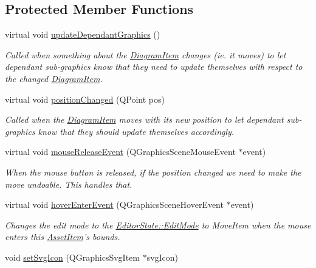 \subsection*{Protected Member Functions}
\begin{DoxyCompactItemize}
\item 
\hypertarget{class_asset_item_a3a7d74e59d32be5bad7c5a3e12afb390}{virtual void \hyperlink{class_asset_item_a3a7d74e59d32be5bad7c5a3e12afb390}{update\-Dependant\-Graphics} ()}\label{class_asset_item_a3a7d74e59d32be5bad7c5a3e12afb390}

\begin{DoxyCompactList}\small\item\em Called when something about the \hyperlink{class_diagram_item}{Diagram\-Item} changes (ie. it moves) to let dependant sub-\/graphics know that they need to update themselves with respect to the changed \hyperlink{class_diagram_item}{Diagram\-Item}. \end{DoxyCompactList}\item 
virtual void \hyperlink{class_asset_item_ae5c7c492bfd4b3aae11b4a9304e4244c}{position\-Changed} (Q\-Point pos)
\begin{DoxyCompactList}\small\item\em Called when the \hyperlink{class_diagram_item}{Diagram\-Item} moves with its new position to let dependant sub-\/graphics know that they should update themselves accordingly. \end{DoxyCompactList}\item 
\hypertarget{class_asset_item_aca4db923d8b5d296c9011fc0bedc3bd0}{virtual void \hyperlink{class_asset_item_aca4db923d8b5d296c9011fc0bedc3bd0}{mouse\-Release\-Event} (Q\-Graphics\-Scene\-Mouse\-Event $\ast$event)}\label{class_asset_item_aca4db923d8b5d296c9011fc0bedc3bd0}

\begin{DoxyCompactList}\small\item\em When the mouse button is released, if the position changed we need to make the move undoable. This handles that. \end{DoxyCompactList}\item 
\hypertarget{class_asset_item_a5035003fbe1c0901007a6402e2766e81}{virtual void \hyperlink{class_asset_item_a5035003fbe1c0901007a6402e2766e81}{hover\-Enter\-Event} (Q\-Graphics\-Scene\-Hover\-Event $\ast$event)}\label{class_asset_item_a5035003fbe1c0901007a6402e2766e81}

\begin{DoxyCompactList}\small\item\em Changes the edit mode to the \hyperlink{class_editor_state_a30123e595784b2228edc2a0c2b46ab28}{Editor\-State\-::\-Edit\-Mode} to Move\-Item when the mouse enters this \hyperlink{class_asset_item}{Asset\-Item}'s bounds. \end{DoxyCompactList}\item 
\hypertarget{class_asset_item_af8829870e21c89afedf5debd29cfe43b}{void \hyperlink{class_asset_item_af8829870e21c89afedf5debd29cfe43b}{set\-Svg\-Icon} (Q\-Graphics\-Svg\-Item $\ast$svg\-Icon)}\label{class_asset_item_af8829870e21c89afedf5debd29cfe43b}


\end{DoxyCompactItemize}
